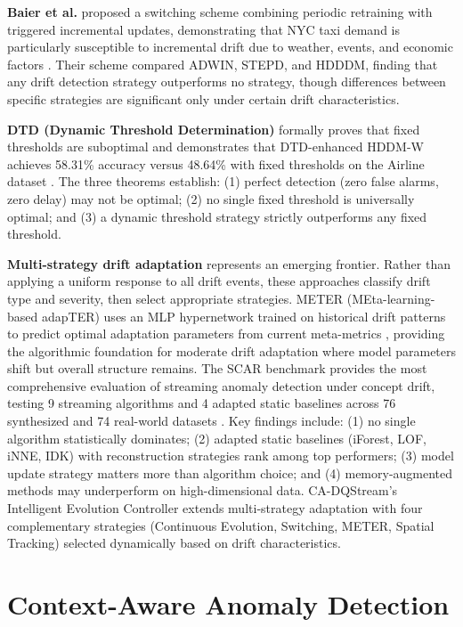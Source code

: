 \textbf{Baier et al.} proposed a switching scheme combining periodic retraining with triggered incremental updates, demonstrating that NYC taxi demand is particularly susceptible to incremental drift due to weather, events, and economic factors \citep{baier2020switching}. Their scheme compared ADWIN, STEPD, and HDDDM, finding that any drift detection strategy outperforms no strategy, though differences between specific strategies are significant only under certain drift characteristics.

\textbf{DTD (Dynamic Threshold Determination)} formally proves that fixed thresholds are suboptimal and demonstrates that DTD-enhanced HDDM-W achieves 58.31\% accuracy versus 48.64\% with fixed thresholds on the Airline dataset \citep{dtd2026}. The three theorems establish: (1) perfect detection (zero false alarms, zero delay) may not be optimal; (2) no single fixed threshold is universally optimal; and (3) a dynamic threshold strategy strictly outperforms any fixed threshold.

\textbf{Multi-strategy drift adaptation} represents an emerging frontier. Rather than applying a uniform response to all drift events, these approaches classify drift type and severity, then select appropriate strategies. METER (MEta-learning-based adapTER) uses an MLP hypernetwork trained on historical drift patterns to predict optimal adaptation parameters from current meta-metrics \citep{meter_2023}, providing the algorithmic foundation for moderate drift adaptation where model parameters shift but overall structure remains. The SCAR benchmark provides the most comprehensive evaluation of streaming anomaly detection under concept drift, testing 9 streaming algorithms and 4 adapted static baselines across 76 synthesized and 74 real-world datasets \citep{scar2025benchmark}. Key findings include: (1) no single algorithm statistically dominates; (2) adapted static baselines (iForest, LOF, iNNE, IDK) with reconstruction strategies rank among top performers; (3) model update strategy matters more than algorithm choice; and (4) memory-augmented methods may underperform on high-dimensional data. CA-DQStream's Intelligent Evolution Controller extends multi-strategy adaptation with four complementary strategies (Continuous Evolution, Switching, METER, Spatial Tracking) selected dynamically based on drift characteristics.

\section{Context-Aware Anomaly Detection}

